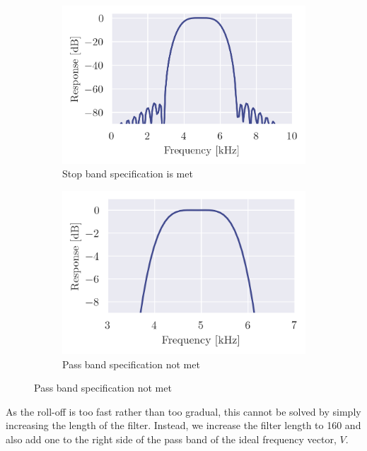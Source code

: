 \begin{figure}[!ht]
    \centering
    \begin{subfigure}[b]{0.45\textwidth}
        \centering
        \includegraphics[width=\textwidth]{images/q3_zoom_1.png}
        \caption{Stop band specification is met}
        \label{fig:q3_zoom_0}
    \end{subfigure}
    \hfill
    \begin{subfigure}[b]{0.45\textwidth}
        \centering
        \includegraphics[width=\textwidth]{images/q3_zoom_2.png}
        \caption{Pass band specification not met}
        \label{fig:q3_zoom_1}
    \end{subfigure}
\end{figure}

As the roll-off is too fast rather than too gradual, this cannot be solved by simply increasing the length of the filter. Instead, we increase the filter length to 160 and also add one to the right side of the pass band of the ideal frequency vector, $V$.

